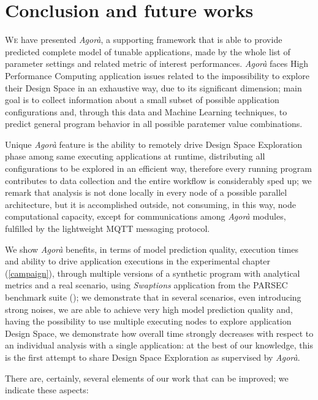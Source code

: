 \chapter{Conclusion and future works}\label{end}

\lettrine{W}{e} have presented \textit{Agorà}, a supporting framework that is able to provide predicted complete model of tunable applications, made by the whole list of parameter settings and related metric of interest performances. \textit{Agorà} faces High Performance Computing application issues related to the impossibility to explore their Design Space in an exhaustive way, due to its significant dimension; main goal is to collect information about a small subset of possible application configurations and, through this data and Machine Learning techniques, to predict general program behavior in all possible paratemer value combinations.

Unique \textit{Agorà} feature is the ability to remotely drive Design Space Exploration phase among same executing applications at runtime, distributing all configurations to be explored in an efficient way, therefore every running program contributes to data collection and the entire workflow is considerably sped up; we remark that analysis is not done locally in every node of a possible parallel architecture, but it is accomplished outside, not consuming, in this way, node computational capacity, except for communications among \textit{Agorà} modules, fulfilled by the lightweight MQTT messaging protocol.

We show \textit{Agorà} benefits, in terms of model prediction quality, execution times and ability to drive application executions in the experimental chapter (\ref{campaign}), through multiple versions of a synthetic program with analytical metrics and a real scenario, using \textit{Swaptions} application from the PARSEC benchmark suite (\cite{bienia2008parsec}); we demonstrate that in several scenarios, even introducing strong noises, we are able to achieve very high model prediction quality and, having the possibility to use multiple executing nodes to explore application Design Space, we demonstrate how overall time strongly decreases with respect to an individual analysis with a single application: at the best of our knowledge, this is the first attempt to share Design Space Exploration as supervised by \textit{Agorà}.

There are, certainly, several elements of our work that can be improved; we indicate these aspects:

